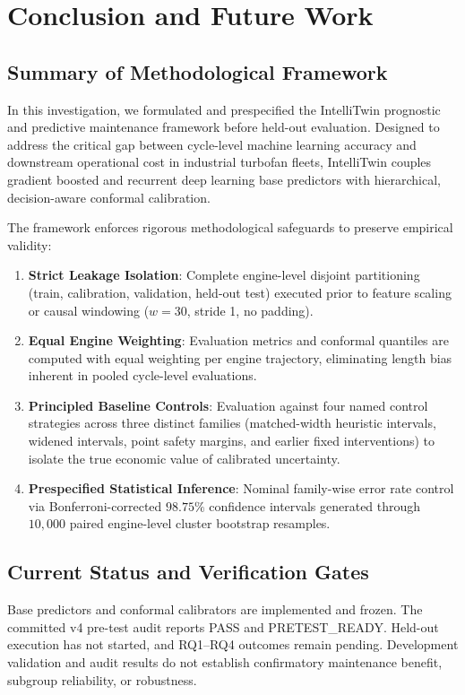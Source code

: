 \section{Conclusion and Future Work}
\label{sec:conclusion}

\subsection{Summary of Methodological Framework}
In this investigation, we formulated and prespecified the IntelliTwin prognostic and predictive maintenance framework before held-out evaluation. Designed to address the critical gap between cycle-level machine learning accuracy and downstream operational cost in industrial turbofan fleets, IntelliTwin couples gradient boosted and recurrent deep learning base predictors with hierarchical, decision-aware conformal calibration. 

The framework enforces rigorous methodological safeguards to preserve empirical validity:
\begin{enumerate}
    \item \textbf{Strict Leakage Isolation}: Complete engine-level disjoint partitioning (train, calibration, validation, held-out test) executed prior to feature scaling or causal windowing ($w=30$, stride 1, no padding).
    \item \textbf{Equal Engine Weighting}: Evaluation metrics and conformal quantiles are computed with equal weighting per engine trajectory, eliminating length bias inherent in pooled cycle-level evaluations.
    \item \textbf{Principled Baseline Controls}: Evaluation against four named control strategies across three distinct families (matched-width heuristic intervals, widened intervals, point safety margins, and earlier fixed interventions) to isolate the true economic value of calibrated uncertainty.
    \item \textbf{Prespecified Statistical Inference}: Nominal family-wise error rate control via Bonferroni-corrected $98.75\%$ confidence intervals generated through $10{,}000$ paired engine-level cluster bootstrap resamples.
\end{enumerate}

\subsection{Current Status and Verification Gates}
Base predictors and conformal calibrators are implemented and frozen. The committed v4 pre-test audit reports PASS and PRETEST\_READY. Held-out execution has not started, and RQ1–RQ4 outcomes remain pending. Development validation and audit results do not establish confirmatory maintenance benefit, subgroup reliability, or robustness.

